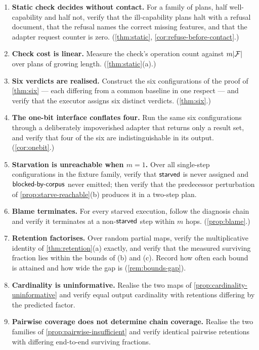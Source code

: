 \begin{enumerate}[label=(V\arabic*),leftmargin=3em]
\item \textbf{Static check decides without contact.} For a family of plans,
half well-capability and half not, verify that the ill-capability plans halt
with a refusal document, that the refusal names the correct missing features,
and that the adapter request counter is zero.
(\cref{thm:static}, \cref{cor:refuse-before-contact}.)
\item \textbf{Check cost is linear.} Measure the check's operation count
against $m|\mathcal{F}|$ over plans of growing length. (\cref{thm:static}(a).)
\item \textbf{Six verdicts are realised.} Construct the six configurations of
the proof of \cref{thm:six} --- each differing from a common baseline in one
respect --- and verify that the executor assigns six distinct verdicts.
(\cref{thm:six}.)
\item \textbf{The one-bit interface conflates four.} Run the same six
configurations through a deliberately impoverished adapter that returns only a
result set, and verify that four of the six are indistinguishable in its
output. (\cref{cor:onebit}.)
\item \textbf{Starvation is unreachable when $m=1$.} Over all single-step
configurations in the fixture family, verify that $\textsf{starved}$ is never assigned
and $\textsf{blocked-by-corpus}$ never emitted; then verify that the predecessor perturbation of
\cref{prop:starve-reachable}(b) produces it in a two-step plan.
\item \textbf{Blame terminates.} For every starved execution, follow the
diagnosis chain and verify it terminates at a non-$\textsf{starved}$ step within $m$
hops. (\cref{prop:blame}.)
\item \textbf{Retention factorises.} Over random partial maps, verify the
multiplicative identity of \cref{thm:retention}(a) exactly, and verify that the
measured surviving fraction lies within the bounds of (b) and (c). Record how
often each bound is attained and how wide the gap is
(\cref{rem:bounds-gap}).
\item \textbf{Cardinality is uninformative.} Realise the two maps of
\cref{prop:cardinality-uninformative} and verify equal output cardinality with
retentions differing by the predicted factor.
\item \textbf{Pairwise coverage does not determine chain coverage.} Realise the
two families of \cref{prop:pairwise-insufficient} and verify identical pairwise
retentions with differing end-to-end surviving fractions.

\end{enumerate}
